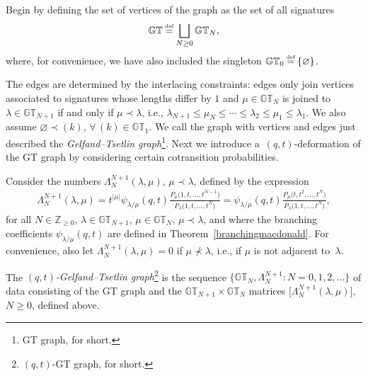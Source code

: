 \documentclass[pdftex]{sigma}
\numberwithin{equation}{section}
\newcommand\myeq{\mathrel{\stackrel{\makebox[0pt]{\mbox{\normalfont\tiny def}}}{=}}}
\newcommand{\Z}{\mathbb{Z}}
\newcommand{\GT}{\mathbb{GT}}
\begin{document}
Begin by def\/ining the set of vertices of the graph as the set of all signatures
\begin{gather*}
\GT \myeq \bigsqcup_{N\geq 0}{\GT_N},
\end{gather*}
where, for convenience, we have also included the singleton $\GT_0 \myeq \{\varnothing\}$.

The edges are determined by the interlacing constraints: edges only join vertices associated to signatures whose lengths dif\/fer by $1$ and $\mu\in\GT_N$ is joined to $\lambda\in\GT_{N+1}$ if and only if $\mu \prec \lambda$, i.e., $\lambda_{N+1} \leq \mu_N \leq \cdots \leq \lambda_2 \leq \mu_1 \leq \lambda_1$. We also assume $\varnothing\prec (k)$, $\forall\, (k)\in\GT_1$. We call the graph with vertices and edges just described the \textit{Gelfand--Tsetlin graph}\footnote{GT graph, for short.}. Next we introduce a~$(q, t)$-deformation of the GT graph by considering certain cotransition probabilities.

\begin{df}
Consider the numbers $\Lambda^{N+1}_N(\lambda, \mu)$, $\mu\prec\lambda$, def\/ined by the expression
\begin{gather}\label{eq:linkdef}
\Lambda^{N+1}_N(\lambda, \mu) = t^{|\mu|}\psi_{\lambda/\mu}(q, t)\frac{P_{\mu}\big(1, t, \dots, t^{N-1}\big)}{P_{\lambda}\big(1, t, \dots, t^N\big)} = \psi_{\lambda/\mu}(q, t)\frac{P_{\mu}\big(t, t^2, \dots, t^N\big)}{P_{\lambda}(1, t, \dots, t^N\big)},
\end{gather}
for all $N\in\Z_{\geq 0}$, $\lambda\in\GT_{N+1}$, $\mu\in\GT_N$, $\mu\prec\lambda$, and where the branching coef\/f\/icients $\psi_{\lambda/\mu}(q, t)$ are def\/ined in Theorem~\ref{branchingmacdonald}. For convenience, also let $\Lambda^{N+1}_N(\lambda, \mu) = 0$ if $\mu\not\prec\lambda$, i.e., if $\mu$ is not adjacent to~$\lambda$.

The \textit{$(q, t)$-Gelfand--Tsetlin graph}\footnote{$(q, t)$-GT graph, for short.} is the sequence $\big\{\GT_N, \Lambda^{N+1}_N\colon N = 0, 1, 2, \dots\big\}$ of data consisting of the GT graph and the $\GT_{N+1}\times\GT_N$ matrices $\big[\Lambda^{N+1}_N(\lambda, \mu)\big]$, $N \geq 0$, def\/ined above.
\end{df}
\end{document}
